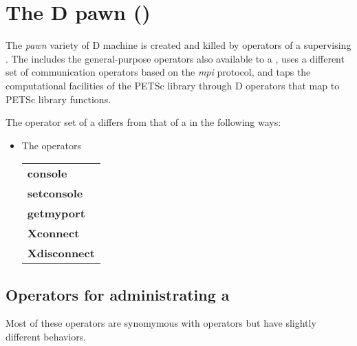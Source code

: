 \section{The D pawn ()}

The \emph{pawn} variety of D machine is created and killed by
operators of a supervising . The  includes the
general-purpose operators also available to a , uses a
different set of communication operators based on the \emph{mpi}
protocol, and taps the computational facilities of the PETSc library
through D operators that map to PETSc library functions.

The operator set of a  differs from that of a  in the following ways:

\begin{itemize}
\item The operators\\
\begin{tabular}{>{\sffamily\bfseries}l}
console\\
setconsole\\
getmyport \\
Xconnect\\
Xdisconnect\\
\end{tabular}
\end{itemize}


\subsection{Operators for administrating a }

Most of these operators are synomymous with  operators but
have slightly different behaviors.

